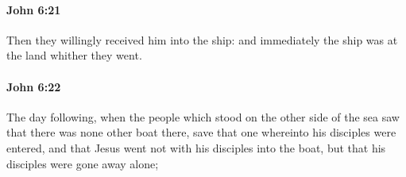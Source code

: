 		\paragraph{John 6:21} %
			\label{JOHN-6-21}

			Then they willingly received him into the ship: and immediately the ship was at the land whither they went.

			\begin{framed}
			\scriptsize
				\begin{compactdesc}
					\item[SBLG] 
				\end{compactdesc}
			\end{framed}

		\paragraph{John 6:22} %
			\label{JOHN-6-22}

			The day following, when the people which stood on the other side of the sea saw that there was none other boat there, save that one whereinto his disciples were entered, and that Jesus went not with his disciples into the boat, but that his disciples were gone away alone;


